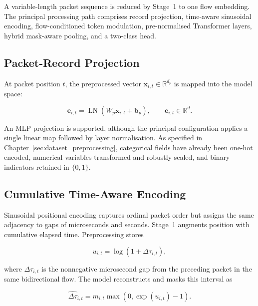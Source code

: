 \documentclass[11pt,fleqn]{report}
\begin{document}
A variable-length packet sequence is reduced by Stage~1 to one flow embedding. The principal processing path comprises record projection, time-aware sinusoidal encoding, flow-conditioned token modulation, pre-normalised Transformer layers, hybrid mask-aware pooling, and a two-class head.

\subsection{Packet-Record Projection}
\label{subsubsec:packet_projection}

At packet position $t$, the preprocessed vector $\mathbf{x}_{i,t}\in\mathbb{R}^{d_p}$ is mapped into the model space:

\begin{equation}
    \mathbf{e}_{i,t}
    =\operatorname{LN}
    \left(W_p\mathbf{x}_{i,t}+\mathbf{b}_p\right),
    \qquad
    \mathbf{e}_{i,t}\in\mathbb{R}^{d}.
    \label{eq:record_projection}
\end{equation}

An MLP projection is supported, although the principal configuration applies a single linear map followed by layer normalisation. As specified in Chapter~\ref{sec:dataset_preprocessing}, categorical fields have already been one-hot encoded, numerical variables transformed and robustly scaled, and binary indicators retained in $\{0,1\}$.

\subsection{Cumulative Time-Aware Encoding}
\label{subsubsec:time_aware_encoding}

Sinusoidal positional encoding captures ordinal packet order but assigns the same adjacency to gaps of microseconds and seconds. Stage~1 augments position with cumulative elapsed time. Preprocessing stores

\begin{equation}
    u_{i,t}=\log\left(1+\Delta\tau_{i,t}\right),
    \label{eq:stored_log_iat}
\end{equation}

where $\Delta\tau_{i,t}$ is the nonnegative microsecond gap from the preceding packet in the same bidirectional flow. The model reconstructs and masks this interval as

\begin{equation}
    \widehat{\Delta\tau}_{i,t}
    =m_{i,t}\max\left(0,\exp(u_{i,t})-1\right).
    \label{eq:reconstructed_iat}
\end{equation}
\end{document}
